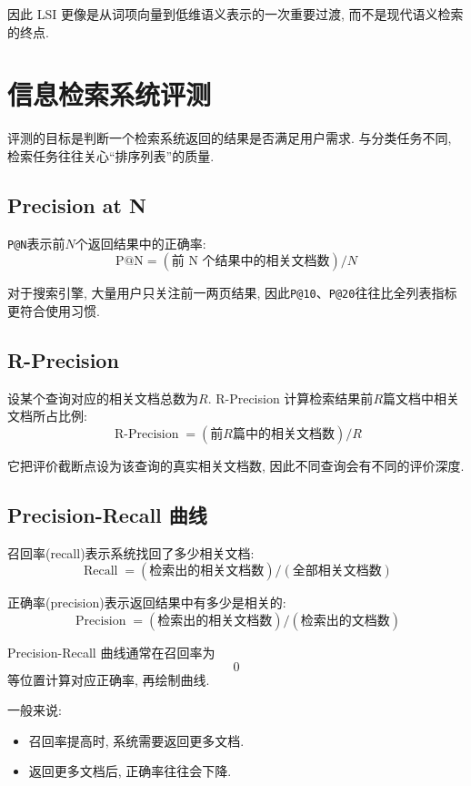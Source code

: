 因此 LSI 更像是从词项向量到低维语义表示的一次重要过渡,
而不是现代语义检索的终点.

\section{信息检索系统评测}


评测的目标是判断一个检索系统返回的结果是否满足用户需求.
与分类任务不同, 检索任务往往关心“排序列表”的质量.

\subsection{Precision at N}


\texttt{P@N}表示前$N$个返回结果中的正确率:
\[
\text{P@N} = (\text{前 N 个结果中的相关文档数}) / N
\]

对于搜索引擎, 大量用户只关注前一两页结果,
因此\texttt{P@10}、\texttt{P@20}往往比全列表指标更符合使用习惯.

\subsection{R-Precision}


设某个查询对应的相关文档总数为$R$.
R-Precision 计算检索结果前$R$篇文档中相关文档所占比例:
\[
\operatorname{R\text{-}Precision}
  = (\text{前}R\text{篇中的相关文档数}) / R
\]

它把评价截断点设为该查询的真实相关文档数,
因此不同查询会有不同的评价深度.

\subsection{Precision-Recall 曲线}


召回率(recall)表示系统找回了多少相关文档:
\[
\operatorname{Recall}
  = (\text{检索出的相关文档数}) / (\text{全部相关文档数})
\]

正确率(precision)表示返回结果中有多少是相关的:
\[
\operatorname{Precision}
  = (\text{检索出的相关文档数}) / (\text{检索出的文档数})
\]

Precision-Recall 曲线通常在召回率为
\[
0%
\]
等位置计算对应正确率, 再绘制曲线.

一般来说:

\begin{itemize}
\item 召回率提高时, 系统需要返回更多文档.
\item 返回更多文档后, 正确率往往会下降.
\end{itemize}


